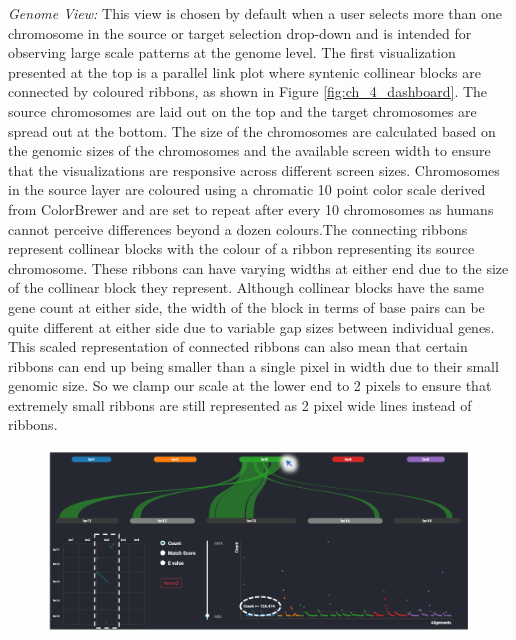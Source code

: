 \textit{Genome View:}
This view is chosen by default when a user selects more than one chromosome in the source or target selection drop-down and is intended for observing large scale patterns at the genome level.
The first visualization presented at the top is a parallel link plot where syntenic collinear blocks are connected by coloured ribbons, as shown in Figure \ref{fig:ch_4_dashboard}. The source chromosomes are laid out on the top and the target chromosomes are spread out at the bottom. The size of the chromosomes are calculated based on the genomic sizes of the chromosomes and the available screen width to ensure that the visualizations are responsive across different screen sizes. Chromosomes in the source layer are coloured using a chromatic 10 point color scale derived from ColorBrewer\cite{colorbrewer} and are set to repeat after every 10 chromosomes as humans cannot perceive differences beyond a dozen colours\cite{ware2012information}.The connecting ribbons represent collinear blocks with the colour of a ribbon representing its source chromosome. These ribbons can have varying widths at either end due to the size of the collinear block they represent. Although collinear blocks have the same gene count at either side, the width of the block in terms of base pairs can be quite different at either side due to variable gap sizes between individual genes. This scaled representation of connected ribbons can also mean that certain ribbons can end up being smaller than a single pixel in width due to their small genomic size. So we clamp our scale at the lower end to 2 pixels to ensure that extremely small ribbons are still represented as 2 pixel wide lines instead of ribbons.


\begin{figure}
  \centering
  \includegraphics[width=1\linewidth]{images/ch_5_genome_view_2.PNG}
  \label{fig:ch_5_genome_view_2}
\end{figure} 


